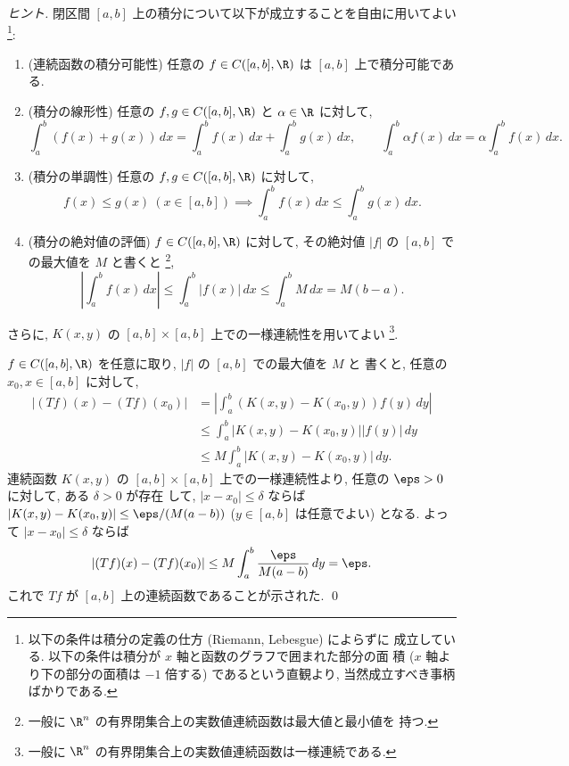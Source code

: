 \documentclass[12pt,twoside]{jarticle}
\begin{document}
\begin{proof}[ヒント]
  閉区間 $[a,b]$ 上の積分について以下が成立することを自由に用いてよい%
  \footnote{以下の条件は積分の定義の仕方 (Riemann, Lebesgue) によらずに
    成立している.  以下の条件は積分が $x$ 軸と函数のグラフで囲まれた部分の面
    積 ($x$ 軸より下の部分の面積は $-1$ 倍する) であるという直観より, 
    当然成立すべき事柄ばかりである.}:
  \begin{enumerate}
  \item (連続函数の積分可能性) \quad 
    任意の $f\in C([a,b],\R)$ は $[a,b]$ 上で積分可能である.
  \item (積分の線形性) \quad
    任意の $f,g\in C([a,b],\R)$ と $\alpha\in\R$ に対して,
    \begin{equation*}
      \int_a^b (f(x)+g(x))\,dx = \int_a^b f(x)\,dx + \int_a^b g(x)\,dx,
      \qquad
      \int_a^b \alpha f(x)\,dx = \alpha \int_a^b f(x)\,dx.
    \end{equation*}
  \item (積分の単調性) \quad
    任意の $f,g\in C([a,b],\R)$ に対して, 
    \begin{equation*}
      f(x)\le g(x) \ (x\in[a,b]) 
      \implies
      \int_a^b f(x)\,dx \le \int_a^b g(x)\,dx.
    \end{equation*}
  \item (積分の絶対値の評価) \quad
    $f\in C([a,b],\R)$ に対して, 
    その絶対値 $|f|$ の $[a,b]$ での最大値を $M$ と書くと%
    \footnote{一般に $\R^n$ の有界閉集合上の実数値連続函数は最大値と最小値を
      持つ.}, 
    \begin{equation*}
      \left|\int_a^b f(x)\,dx\right| 
      \le \int_a^b|f(x)|\,dx
      \le \int_a^b M\,dx = M(b-a).
    \end{equation*}
  \end{enumerate}
  さらに, $K(x,y)$ の $[a,b]\times [a,b]$ 上での一様連続性を用いてよい%
  \footnote{一般に $\R^n$ の有界閉集合上の実数値連続函数は一様連続である.}.

  $f\in C([a,b],\R)$ を任意に取り, $|f|$ の $[a,b]$ での最大値を $M$ と
  書くと, 任意の $x_0,x\in [a,b]$ に対して,
  \begin{align*}
    |(Tf)(x) - (Tf)(x_0)| 
    &
    = \left|\int_a^b (K(x,y) - K(x_0,y))f(y)\,dy \right|
    \\  &
    \le \int_a^b |K(x,y)-K(x_0,y)||f(y)|\,dy
    \\ &
    \le M \int_a^b |K(x,y)-K(x_0,y)|\, dy.
  \end{align*}
  連続函数 $K(x,y)$ の $[a,b]\times[a,b]$ 上での一様連続性より, 
  任意の $\eps>0$ に対して, ある $\delta > 0$ が存在
  して,  $|x-x_0|\le\delta$ ならば $|K(x,y)-K(x_0,y)|\le\eps/(M(a-b))$ 
  ($y\in [a,b]$ は任意でよい) となる.
  よって $|x-x_0|\le\delta$ ならば
  \begin{equation*}
    |(Tf)(x) - (Tf)(x_0)| \le M \int_a^b \frac{\eps}{M(a-b)}\,dy = \eps.
  \end{equation*}
  これで $Tf$ が $[a,b]$ 上の連続函数であることが示された.
  \qed
\end{proof}
\end{document}
